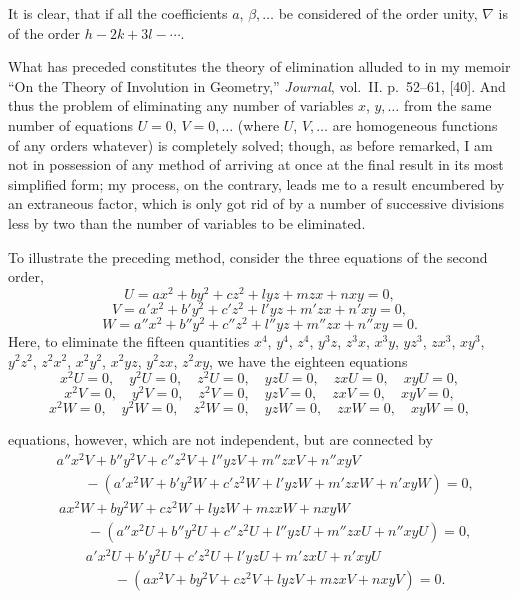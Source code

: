 \documentclass[11pt]{article}
\begin{document}
\medskip
It is clear, that if all the coefficients $a$, $\beta,\ldots$ be considered of the order unity,
$\nabla$ is of the order $h - 2k + 3l - \cdots$.

\medskip
What has preceded constitutes the theory of elimination alluded to in my memoir
``On the Theory of Involution in Geometry,'' \textit{Journal}, vol.~II. p.~52--61, [40]. And thus
the problem of eliminating any number of variables $x$, $y,\ldots$ from the same number of
equations $U = 0$, $V = 0,\ldots$ (where $U$, $V,\ldots$ are homogeneous functions of any orders
whatever) is completely solved; though, as before remarked, I am not in possession of
any method of arriving at once at the final result in its most simplified form; my
process, on the contrary, leads me to a result encumbered by an extraneous factor,
which is only got rid of by a number of successive divisions less by two than the
number of variables to be eliminated.

\medskip
To illustrate the preceding method, consider the three equations of the second order,
\[
U = a x^{2} + b y^{2} + c z^{2} + l yz + m zx + n xy = 0,
\]
\[
V = a' x^{2} + b' y^{2} + c' z^{2} + l' yz + m' zx + n' xy = 0,
\]
\[
W = a'' x^{2} + b'' y^{2} + c'' z^{2} + l'' yz + m'' zx + n'' xy = 0.
\]
Here, to eliminate the fifteen quantities $x^{4}$, $y^{4}$, $z^{4}$, $y^{3}z$, $z^{3}x$, $x^{3}y$, $yz^{3}$, $zx^{3}$, $xy^{3}$, $y^{2}z^{2}$, $z^{2}x^{2}$,
$x^{2}y^{2}$, $x^{2}yz$, $y^{2}zx$, $z^{2}xy$, we have the eighteen equations
\[
x^{2}U = 0,\quad y^{2}U = 0,\quad z^{2}U = 0,\quad yzU = 0,\quad zxU = 0,\quad xyU = 0,
\]
\[
x^{2}V = 0,\quad y^{2}V = 0,\quad z^{2}V = 0,\quad yzV = 0,\quad zxV = 0,\quad xyV = 0,
\]
\[
x^{2}W = 0,\quad y^{2}W = 0,\quad z^{2}W = 0,\quad yzW = 0,\quad zxW = 0,\quad xyW = 0,
\]

\bigskip

\noindent equations, however, which are not independent, but are connected by
\begin{align*}
&a''x^{2}V + b''y^{2}V + c''z^{2}V + l''yzV + m''zxV + n''xyV\\
&\qquad - (a'x^{2}W + b'y^{2}W + c'z^{2}W + l'yzW + m'zxW + n'xyW) = 0,
\end{align*}
\begin{align*}
&a x^{2}W + b y^{2}W + c z^{2}W + l yzW + m zxW + nxyW\\
&\qquad - (a''x^{2}U + b''y^{2}U + c''z^{2}U + l''yzU + m''zxU + n''xyU) = 0,
\end{align*}
\begin{align*}
&a'x^{2}U + b'y^{2}U + c'z^{2}U + l'yzU + m'zxU + n'xyU\\
&\qquad - (a x^{2}V + b y^{2}V + c z^{2}V + l yzV + mzxV + nxyV) = 0.
\end{align*}
\end{document}

